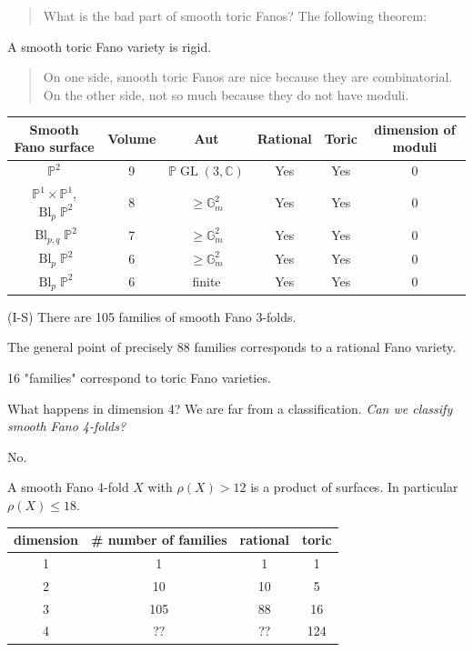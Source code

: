 \begin{quotation}
What is the bad part of smooth toric Fanos?
The following theorem:
\end{quotation}

\begin{theorem}[Cox]
\label{theorem-moraga-5}
A smooth toric Fano variety is rigid.
\end{theorem}

\begin{quotation}
On one side, smooth toric Fanos are nice
because they are combinatorial. On the other
side, not so much because they do not have
moduli.
\end{quotation}

\begin{tabular}{cccccc}
Smooth Fano
surface&Volume&Aut&Rational&Toric&dimension
of moduli\\\hline\hline
$\mathbb{P}^{2}$&9&
$\mathbb{P}\operatorname{GL}(3,\mathbb{C})$&
Yes&Yes&0\\\hline
$\mathbb{P}^{1} \times \mathbb{P}^{1}$,
$\operatorname{Bl}_{p}\mathbb{P}^{2}$&8&$\geq
\mathbb{G}^{2}_{m}$&Yes&Yes&0\\\hline
$\operatorname{Bl}_{p,q}\mathbb{P}^{2}$&7&$
\geq
\mathbb{G}^{2}_{m}$&Yes&Yes&0\\\hline
$\operatorname{Bl}_{p}\mathbb{P}^{2}$&6&$\geq
\mathbb{G}^{2}_{m}$&Yes&Yes&0\\\hline
$\operatorname{Bl}_{p}\mathbb{P}^{2}$&6&
finite&Yes&Yes&0\\\hline
\end{tabular}

\begin{theorem}
\label{theorem-moraga-6}
(I-S) There are 105 families of smooth Fano
3-folds.

The general point of precisely 88 families
corresponds to a rational Fano variety.

16 "families" correspond to toric Fano
varieties.
\end{theorem}

\medskip{} What happens
in dimension 4? We are far from a
classification. \textit{Can we classify
smooth Fano 4-folds?}

No.

\begin{theorem}[Casagrande,24]
\label{theorem-moraga-7}
A smooth Fano 4-fold $X$ with $\rho(X)>12$ is
a product of surfaces. In particular
$\rho(X)\leq 18$.
\end{theorem}
\begin{center}
\begin{tabular}{|c|c|c|c|}
\hline
dimension&\# number of
families&rational&toric\\\hline
1&1&1&1\\\hline
2&10&10&5\\\hline
3&105&88&16\\\hline
4&??&??&124\\\hline
\end{tabular}\end{center}

